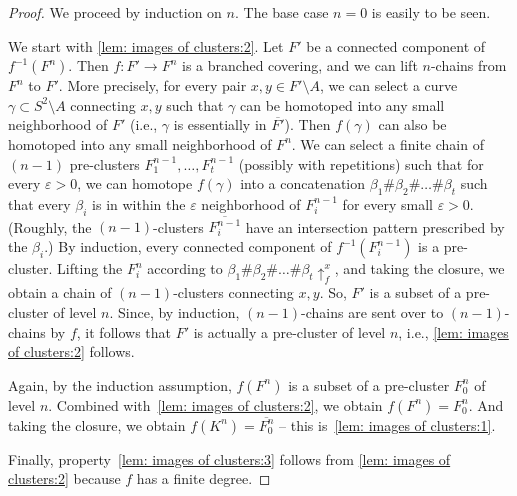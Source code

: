 \documentclass{amsart}
\theoremstyle{plain}
\theoremstyle{definition}
\theoremstyle{remark}
\newcommand\lift[2]{{\uparrow}_{#1}^{#2}}
\begin{document}
\begin{proof}
We proceed by induction on $n$. The base case $n=0$ is easily to be seen.

We start with \ref{lem: images of clusters:2}. Let $F'$ be a connected component of $f^{-1}(F^n)$. Then $f\colon F'\to F^n$ is a branched covering, and we can lift $n$-chains from $F^n$ to $F'$. More precisely, for every pair $x,y\in F'\setminus A$, we can select a curve $\gamma\subset S^2\setminus A$ connecting $x,y$ such that $\gamma$ can be homotoped into any small neighborhood of $F'$ (i.e., $\gamma$ is essentially in $\overline{F'}$). Then $f(\gamma)$ can also be homotoped into any small neighborhood of $F^n$. We can select a finite chain of $(n-1)$ pre-clusters $F^{n-1}_1,\dots ,F^{n-1}_t$ (possibly with repetitions) such that for every $\varepsilon>0$, we can homotope $f(\gamma)$ into a concatenation $\beta_1\#\beta_2\#\dots \#\beta_t$ such that every $\beta_i$ is in within the $\varepsilon$ neighborhood of $F^{n-1}_i$ for every small $\varepsilon>0$. (Roughly, the $(n-1)$-clusters $\overline{F^{n-1}_i}$ have an intersection pattern prescribed by the $\beta_i$.) By induction, every connected component of $f^{-1}(F^{n-1}_i)$ is a pre-cluster. Lifting the $F^n_i$ according to $\beta_1\#\beta_2\#\dots \#\beta_t\lift{f}{x}$, and taking the closure, we obtain a chain of $(n-1)$-clusters connecting $x,y$. So, $F'$ is a subset of a pre-cluster of level $n$. Since, by induction, $(n-1)$-chains are sent over to $(n-1)$-chains by $f$, it follows that $F'$ is actually a pre-cluster of level $n$, i.e., \ref{lem: images of clusters:2} follows.




Again, by the induction assumption, $f(F^n)$ is a subset of a pre-cluster $F^n_0$ of level $n$. Combined with~\ref{lem: images of clusters:2}, we obtain $f(F^n)= F^n_0$. And taking the closure, we obtain $f(K^n)=\overline{F^n_0}$ -- this is~\ref{lem: images of clusters:1}.

Finally, property~\ref{lem: images of clusters:3} follows from \ref{lem: images of clusters:2} because $f$ has a finite degree. 
\end{proof}
\end{document}
